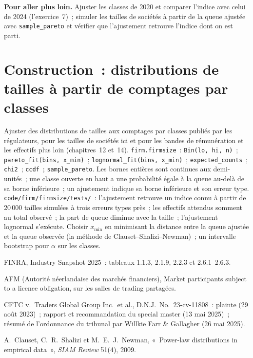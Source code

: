 \textbf{Pour aller plus loin.} Ajuster les classes de 2020 et comparer l'indice avec celui de 2024 (l'exercice~7)~; simuler les tailles de sociétés à partir
de la queue ajustée avec \texttt{sample\_pareto} et vérifier que l'ajustement retrouve l'indice dont on est parti.

\section{Construction~: distributions de tailles à partir de comptages par classes}\label{bld:in:medium-frequency-proprietary-shops:firmsize}

\begin{build}
 Ajuster des distributions de tailles aux comptages par classes publiés par les régulateurs, pour les tailles de sociétés ici et pour les bandes de rémunération
et les effectifs plus loin (chapitres~12 et~14).
 \texttt{firm.firmsize}~: \texttt{Bin(lo, hi, n)}~; \texttt{pareto\_fit(bins, x\_min)}~;
\texttt{lognormal\_fit(bins, x\_min)}~; \texttt{expected\_counts}~; \texttt{chi2}~; \texttt{ccdf}~; \texttt{sample\_pareto}.
 Les bornes entières sont continues aux demi-unités~; une classe ouverte en haut a une probabilité égale à la queue au-delà de sa
borne inférieure~; un ajustement indique sa borne inférieure et son erreur type.
 \texttt{code/firm/firmsize/tests/}~: l'ajustement retrouve un indice connu à partir de 20\,000 tailles simulées
à trois erreurs types près~; les effectifs attendus somment au total observé~; la part de queue diminue avec la taille~;
l'ajustement lognormal s'exécute.
 Choisir $x_{\min}$ en minimisant la distance entre la queue ajustée et la queue observée (la méthode
de Clauset--Shalizi--Newman)~; un intervalle bootstrap pour $\alpha$ sur les classes.
\end{build}

\begin{omsources}
\item FINRA, Industry Snapshot 2025~: tableaux 1.1.3, 2.1.9, 2.2.3 et 2.6.1--2.6.3.
\item AFM (Autorité néerlandaise des marchés financiers), Market participants subject to a licence obligation, sur
les salles de trading partagées.
\item CFTC v.\ Traders Global Group Inc.\ et al., D.N.J.\ No.~23-cv-11808~: plainte (29 août 2023)~; rapport et
recommandation du special master (13 mai 2025)~; résumé de l'ordonnance du tribunal par Willkie Farr \& Gallagher (26 mai 2025).
\item A.~Clauset, C.~R.~Shalizi et M.~E.~J.~Newman, «~Power-law distributions in empirical data~», \emph{SIAM Review}
51(4), 2009.
\end{omsources}

